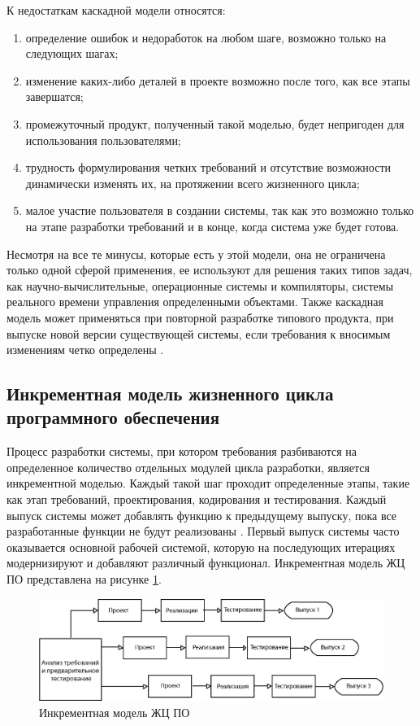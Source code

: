 К недостаткам каскадной модели относятся: 
\begin{enumerate}
    \item [1)] определение ошибок и недоработок на любом шаге, возможно только на следующих шагах;
    \item [2)] изменение каких-либо деталей в проекте возможно после того, как все этапы завершатся;
    \item [3)] промежуточный продукт, полученный такой моделью, будет непригоден для использования пользователями;
    \item [4)] трудность формулирования четких требований и отсутствие возможности динамически изменять их, на протяжении всего жизненного цикла;
    \item [5)] малое участие пользователя в создании системы, так как это возможно только на этапе разработки требований и в конце, когда система уже будет готова.
\end{enumerate}

Несмотря на все те минусы, которые есть у этой модели, она не ограничена только одной сферой применения, ее используют для решения таких типов задач, как научно-вычислительные, операционные системы и компиляторы, системы реального времени управления определенными объектами. Также каскадная модель может применяться при повторной разработке типового продукта, при выпуске новой версии существующей системы, если требования к вносимым изменениям четко определены \cite{23, 20}.

\subsection{Инкрементная модель жизненного цикла программного обеспечения}

Процесс разработки системы, при котором требования разбиваются на определенное количество отдельных модулей цикла разработки, является инкрементной моделью. Каждый такой шаг проходит определенные этапы, такие как этап требований, проектирования, кодирования и тестирования. Каждый выпуск системы может добавлять функцию к предыдущему выпуску, пока все разработанные функции не будут реализованы \cite{8, 9}. Первый выпуск системы часто оказывается основной рабочей системой, которую на последующих итерациях модернизируют и добавляют различный функционал. Инкрементная модель ЖЦ ПО представлена на рисунке \ref{fig:2}.

\begin{figure}[h!]
    \center
    \includegraphics[scale=1]{fig/2.png}
    \caption{Инкрементная модель ЖЦ ПО}
    \label{fig:2}
\end{figure}

